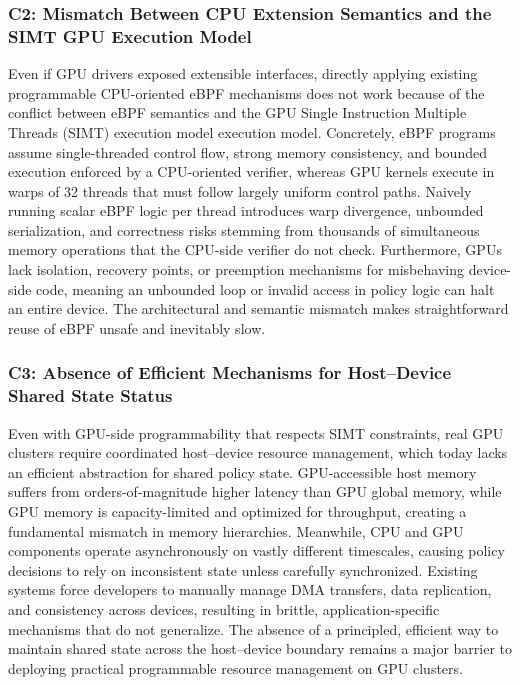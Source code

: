 \subsubsection{C2: Mismatch Between CPU Extension Semantics and the SIMT GPU Execution Model}


Even if GPU drivers exposed extensible interfaces, directly applying existing programmable CPU-oriented eBPF mechanisms does not work because of the conflict between eBPF semantics and the GPU Single Instruction Multiple Threads (SIMT) execution model execution model. 
Concretely, eBPF programs assume single-threaded control flow, strong memory consistency, and bounded execution enforced by a CPU-oriented verifier, whereas GPU kernels execute in warps of 32 threads that must follow largely uniform control paths. 
Naively running scalar eBPF logic per thread introduces warp divergence, unbounded serialization, and correctness risks stemming from thousands of simultaneous memory operations that the CPU-side verifier do not check. 
Furthermore, GPUs lack isolation, recovery points, or preemption mechanisms for misbehaving device-side code, meaning an unbounded loop or invalid access in policy logic can halt an entire device. 
The architectural and semantic mismatch makes straightforward reuse of eBPF unsafe and inevitably slow.

\subsubsection{C3: Absence of Efficient Mechanisms for Host–Device Shared State Status}

Even with GPU-side programmability that respects SIMT constraints, real GPU clusters require coordinated host–device resource management, which today lacks an efficient abstraction for shared policy state. 
GPU-accessible host memory suffers from orders-of-magnitude higher latency than GPU global memory, while GPU memory is capacity-limited and optimized for throughput, creating a fundamental mismatch in memory hierarchies. 
Meanwhile, CPU and GPU components operate asynchronously on vastly different timescales, causing policy decisions to rely on inconsistent state unless carefully synchronized. 
Existing systems force developers to manually manage DMA transfers, data replication, and consistency across devices, resulting in brittle, application-specific mechanisms that do not generalize.
The absence of a principled, efficient way to maintain shared state across the host–device boundary remains a major barrier to deploying practical programmable resource management on GPU clusters.

